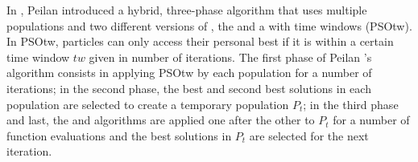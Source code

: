 %
In \cite{XuLuoLin19:ieee-cec}, Peilan \etal introduced a hybrid, three-phase algorithm that uses multiple populations and two different versions of \PSO, the \stanPSO and a \PSO with time windows (PSOtw).
In PSOtw, particles can only access their personal best if it is within a certain time window $tw$ given in number of iterations.
The first phase of Peilan \etal's algorithm consists in applying PSOtw by each population for a number of iterations; in the second phase, the best and second best solutions in each population are selected to create a temporary population $P_t$; in the third phase and last, the \stanPSO and \CMAES algorithms are applied one after the other to $P_t$ for a number of function evaluations and the best solutions in $P_t$ are selected for the next iteration.
%

